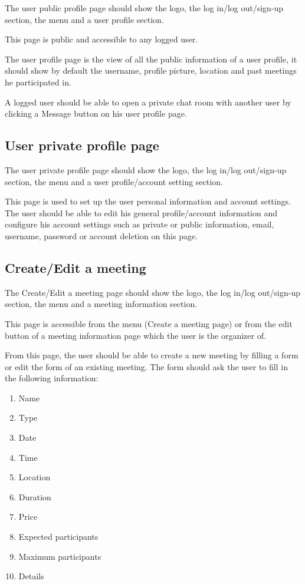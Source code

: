 \documentclass[conference]{IEEEtran}
\begin{document}
The user public profile page should show the logo, the log in/log out/sign-up section, the menu and a user profile section.

This page is public and accessible to any logged user.

The user profile page is the view of all the public information of a user profile, it should show by default the username, profile picture, location and past meetings he participated in.

A logged user should be able to open a private chat room with another user by clicking a Message button on his user profile page.

\subsection{User private profile page}

The user private profile page should show the logo, the log in/log out/sign-up section, the menu and a user profile/account setting section.

This page is used to set up the user personal information and account settings. 
The user should be able to edit his general profile/account information and configure his account settings such as private or public information, email, username, password or account deletion on this page.

\subsection{Create/Edit a meeting}

The Create/Edit a meeting page should show the logo, the log in/log out/sign-up section, the menu and a meeting information section.

This page is accessible from the menu (Create a meeting page) or from the edit button of a meeting information page which the user is the organizer of.

From this page, the user should be able to create a new meeting by filling a form or edit the form of an existing meeting.
The form should ask the user to fill in the following information:

\begin{enumerate}
    \item Name
    \item Type
    \item Date
    \item Time
    \item Location
    \item Duration
    \item Price
    \item Expected participants
    \item Maximum participants
    \item Details
\end{enumerate}
\end{document}
